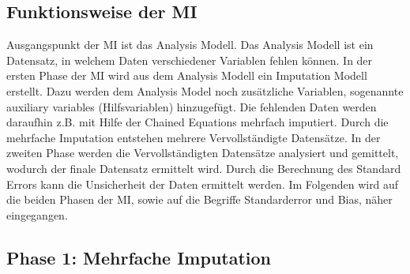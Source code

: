 \subsection{Funktionsweise der MI}

Ausgangspunkt der MI ist das Analysis Modell. Das Analysis Modell ist ein Datensatz, in welchem Daten verschiedener Variablen 
fehlen können. In der ersten Phase der MI wird aus dem Analysis Modell ein Imputation Modell erstellt. Dazu werden dem 
Analysis Model noch zusätzliche Variablen, sogenannte auxiliary variables (Hilfsvariablen) hinzugefügt. Die fehlenden 
Daten werden daraufhin z.B. mit Hilfe der Chained Equations mehrfach imputiert. Durch die mehrfache Imputation entstehen 
mehrere Vervollständigte Datensätze. In der zweiten Phase werden die Vervollständigten Datensätze analysiert und gemittelt, 
wodurch der finale Datensatz ermittelt wird. Durch die Berechnung des Standard Errors kann die Unsicherheit der Daten 
ermittelt werden. \autocite[163]{Lee2014} Im Folgenden wird auf die beiden Phasen der MI, sowie auf die Begriffe Standarderror und Bias, näher eingegangen.

\subsection{Phase 1: Mehrfache Imputation}

